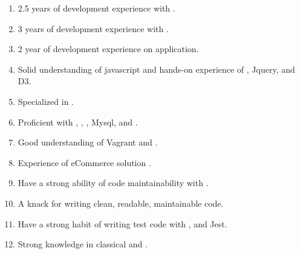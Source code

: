 \break
{}
  \begin{enumerate}[leftmargin=4ex, nosep, noitemsep]
    \item 2.5 years of development experience with .
    \item 3 years of development experience with .
    \item 2 year of development experience on  application.
    \item Solid understanding of javascript and hands-on experience of , Jquery,  and D3.
    \item Specialized in .
    \item Proficient with , , , Mysql, and .
    \item Good understanding of Vagrant and .
    \item Experience of eCommerce solution .
    \item Have a strong ability of code maintainability with .
    \item A knack for writing clean, readable, maintainable code.
    \item Have a strong habit of writing test code with ,  and Jest.
    \item Strong knowledge in classical  and .
  \end{enumerate}

